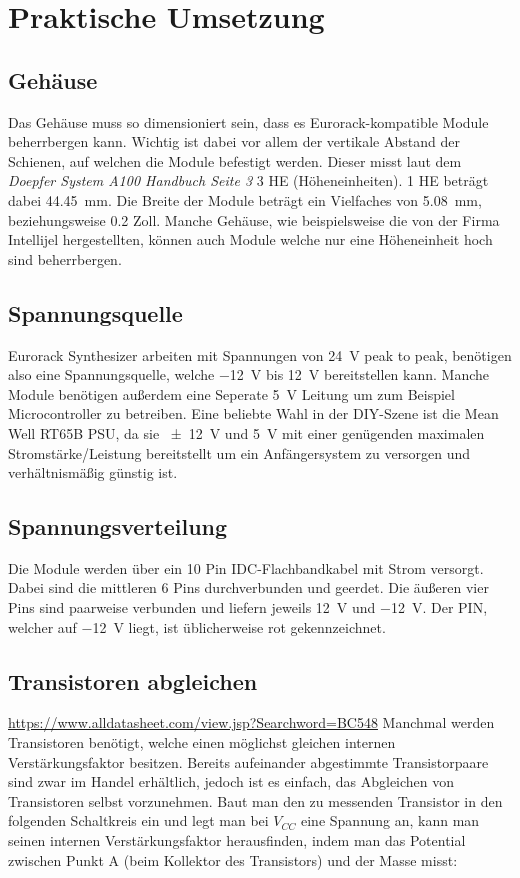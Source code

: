 \chapter{Praktische Umsetzung}

\section{Gehäuse}
\label{sec:org9e2e4e7}
Das Gehäuse muss so dimensioniert sein, dass es Eurorack-kompatible Module beherrbergen kann. Wichtig ist dabei vor allem der vertikale Abstand der Schienen, auf welchen die Module befestigt werden. Dieser misst laut dem \emph{Doepfer System A100 Handbuch Seite 3} 3 HE (Höheneinheiten). 1 HE beträgt dabei \SI{44.45}{\milli\meter}. Die Breite der Module beträgt ein Vielfaches von \SI{5.08}{\milli\meter}, beziehungsweise 0.2 Zoll. Manche Gehäuse, wie beispielsweise die von der Firma Intellijel hergestellten, können auch Module welche nur eine Höheneinheit hoch sind beherrbergen.

\section{Spannungsquelle}
\label{sec:org93ecd50}
Eurorack Synthesizer arbeiten mit Spannungen von \SI{24}{\volt} peak to peak, benötigen also eine Spannungsquelle, welche \SI{-12}{\volt} bis \SI{+12}{\volt} bereitstellen kann. Manche Module benötigen außerdem eine Seperate \SI{5}{\volt} Leitung um zum Beispiel Microcontroller zu betreiben. Eine beliebte Wahl in der DIY-Szene ist die Mean Well RT65B PSU, da sie \SI{\pm 12}{\volt} und \SI{5}{\volt} mit einer genügenden maximalen Stromstärke/Leistung bereitstellt um ein Anfängersystem zu versorgen und verhältnismäßig günstig ist.

\section{Spannungsverteilung}
\label{sec:org4c9e8fe}
Die Module werden über ein 10 Pin IDC-Flachbandkabel mit Strom versorgt. Dabei sind die mittleren 6 Pins durchverbunden und geerdet. Die äußeren vier Pins sind paarweise verbunden und liefern jeweils \SI{+12}{\volt} und \SI{-12}{\volt}. Der PIN, welcher auf \SI{-12}{\volt} liegt, ist üblicherweise rot gekennzeichnet.

\section{Transistoren abgleichen}
\label{sec:orgf6439ae}
\url{https://www.alldatasheet.com/view.jsp?Searchword=BC548}
Manchmal werden Transistoren benötigt, welche einen möglichst gleichen internen Verstärkungsfaktor besitzen. Bereits aufeinander abgestimmte Transistorpaare sind zwar im Handel erhältlich, jedoch ist es einfach, das Abgleichen von Transistoren selbst vorzunehmen. Baut man den zu messenden Transistor in den folgenden Schaltkreis ein und legt man bei \(V_{CC}\) eine Spannung an, kann man seinen internen Verstärkungsfaktor herausfinden, indem man das Potential zwischen Punkt A (beim Kollektor des Transistors) und der Masse misst:

